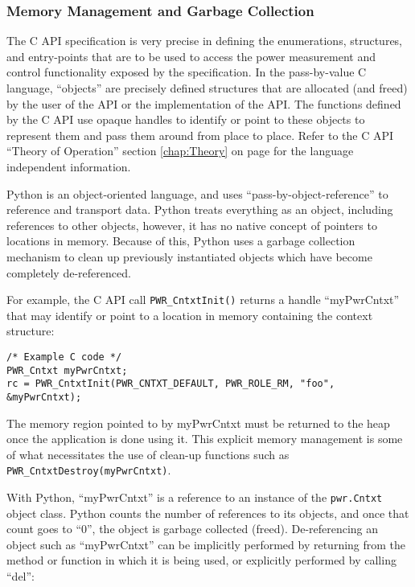 \documentclass[12pt]{report} %
\begin{document}
\begin{appendices}
\subsubsection{Memory Management and Garbage Collection}\label{sec:PythonMemoryManagement}

The C API specification is very precise in defining the enumerations,
structures, and entry-points that are to be used to access the power
measurement and control functionality exposed by the specification. In the
pass-by-value C language, ``objects'' are precisely defined structures that are
allocated (and freed) by the user of the API or the implementation of the API.
The functions defined by the C API use opaque handles to identify or point to
these objects to represent
them and pass them around from place to place. Refer to the C API ``Theory of
Operation'' section \ref{chap:Theory} on page \pageref{chap:Theory} for the
language independent information.

Python is an object-oriented language, and uses ``pass-by-object-reference'' to
reference and transport data. Python treats everything as an object, including
references to other objects, however, it has no native concept of pointers to
locations in memory. Because of this, Python uses a garbage collection
mechanism to clean up previously instantiated objects which have become
completely de-referenced.

For example, the C API call \texttt{PWR_CntxtInit()} returns a handle
``myPwrCntxt'' that may identify or point to a location in memory containing
the context structure:

\begin{center}\begin{minipage}{.95\linewidth}\begin{lstlisting}
/* Example C code */
PWR_Cntxt myPwrCntxt;
rc = PWR_CntxtInit(PWR_CNTXT_DEFAULT, PWR_ROLE_RM, "foo", &myPwrCntxt);
\end{lstlisting}\end{minipage}\end{center}

The memory region pointed to by myPwrCntxt must be returned to the heap once
the application is done using it. This explicit memory management is some of
what necessitates the use of clean-up functions such as
\texttt{PWR_CntxtDestroy(myPwrCntxt)}.

With Python, ``myPwrCntxt'' is a reference to an instance of the
\texttt{pwr.Cntxt} object class. Python counts the number of references to its
objects, and once that count goes to ``0'', the object is garbage collected
(freed). De-referencing an object such as ``myPwrCntxt'' can be implicitly
performed by returning from the method or function in which it is being used,
or explicitly performed by calling ``del'':


\end{appendices}
\end{document}
